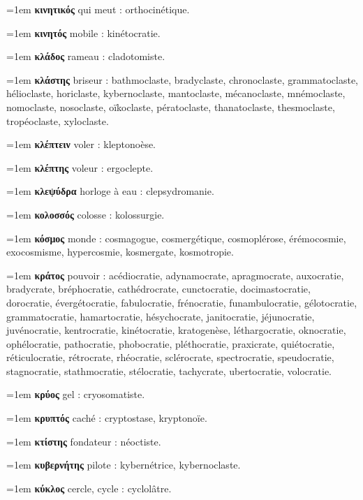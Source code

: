 \hangindent=1em \textbf{κινητικός} qui meut : orthocinétique.\par
\hangindent=1em \textbf{κινητός} mobile : kinétocratie.\par
\hangindent=1em \textbf{κλάδος} rameau : cladotomiste.\par
\hangindent=1em \textbf{κλάστης} briseur : bathmoclaste, bradyclaste, chronoclaste, grammatoclaste, hélioclaste, horiclaste, kybernoclaste, mantoclaste, mécanoclaste, mnémoclaste, nomoclaste, nosoclaste, oïkoclaste, pératoclaste, thanatoclaste, thesmoclaste, tropéoclaste, xyloclaste.\par
\hangindent=1em \textbf{κλέπτειν} voler : kleptonoèse.\par
\hangindent=1em \textbf{κλέπτης} voleur : ergoclepte.\par
\hangindent=1em \textbf{κλεψύδρα} horloge à eau : clepsydromanie.\par
\hangindent=1em \textbf{κολοσσός} colosse : kolossurgie.\par
\hangindent=1em \textbf{κόσμος} monde : cosmagogue, cosmergétique, cosmoplérose, érémocosmie, exocosmisme, hypercosmie, kosmergate, kosmotropie.\par
\hangindent=1em \textbf{κράτος} pouvoir : acédiocratie, adynamocrate, apragmocrate, auxocratie, bradycrate, bréphocratie, cathédrocrate, cunctocratie, docimastocratie, dorocratie, évergétocratie, fabulocratie, frénocratie, funambulocratie, gélotocratie, grammatocratie, hamartocratie, hésychocrate, janitocratie, jéjunocratie, juvénocratie, kentrocratie, kinétocratie, kratogenèse, léthargocratie, oknocratie, ophélocratie, pathocratie, phobocratie, pléthocratie, praxicrate, quiétocratie, réticulocratie, rétrocrate, rhéocratie, sclérocrate, spectrocratie, speudocratie, stagnocratie, stathmocratie, stélocratie, tachycrate, ubertocratie, volocratie.\par
\hangindent=1em \textbf{κρύος} gel : cryosomatiste.\par
\hangindent=1em \textbf{κρυπτός} caché : cryptostase, kryptonoïe.\par
\hangindent=1em \textbf{κτίστης} fondateur : néoctiste.\par
\hangindent=1em \textbf{κυβερνήτης} pilote : kybernétrice, kybernoclaste.\par
\hangindent=1em \textbf{κύκλος} cercle, cycle : cyclolâtre.\par
